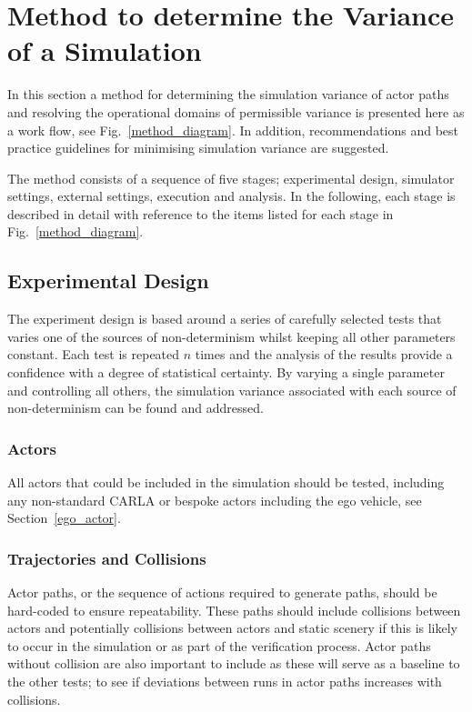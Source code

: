\DIFaddbegin 

\DIFaddend \section{Method to determine the Variance of a Simulation} \label{s:methodology}
In this section a method for determining the simulation variance of actor paths and resolving the operational domains of permissible variance is presented here as a work flow, see Fig.~\ref{method_diagram}. In addition, recommendations and best practice guidelines for minimising simulation variance are suggested.

The method consists of a sequence of five stages; experimental design, simulator settings, external settings, execution and analysis. In the following, each stage is described in detail with reference to the items listed for each stage in Fig.~\ref{method_diagram}.

\subsection{Experimental Design}\label{s:design_experiment}

The experiment design is based around a series of carefully selected tests that varies one of the sources of non-determinism whilst keeping all other parameters constant. Each test is repeated $n$ times and the analysis of the results provide a confidence with a degree of statistical certainty. By varying a single parameter and controlling all others, the simulation variance associated with each source of non-determinism can be found and addressed. 

\subsubsection{Actors} \label{s:actors}

All actors that could be included in the simulation should be tested, including any non-standard CARLA or bespoke actors including the ego vehicle, see Section~\ref{ego_actor}. 

\subsubsection{Trajectories and Collisions} 
Actor paths, or the sequence of actions required to generate paths, should be hard-coded to ensure repeatability. These paths should include collisions between actors and potentially collisions between actors and static scenery if this is likely to occur in the simulation or as part of the verification process. Actor paths without collision are also important to include as these will serve as a baseline to the other tests; to see if deviations between runs in actor paths increases with collisions. 

